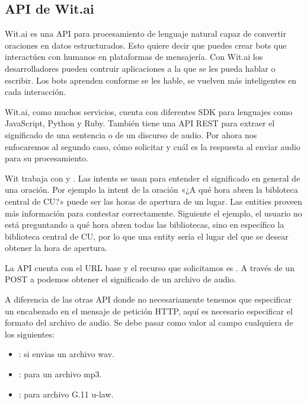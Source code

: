 \subsection{API de Wit.ai}
\label{\detokenize{chapter_one/apis_rest:api-de-wit-ai}}
Wit.ai es una API para procesamiento de lenguaje natural capaz de convertir
oraciones en datos estructurados. Esto quiere decir que puedes crear bots
que interactúen con humanos en plataformas de mensajería. Con Wit.ai los
desarrolladores pueden contruir aplicaciones a la que se les pueda hablar o
escribir. Los bots aprenden conforme se les hable, se vuelven más inteligentes
en cada interacción.

Wit.ai, como muchos servicios, cuenta con diferentes SDK para lenguajes como
JavaScript, Python y Ruby. También tiene una API REST para extraer el significado
de una sentencia o de un discurso de audio. Por ahora nos enfocaremos
al segundo caso, cómo solicitar y cuál es la respuesta al enviar audio
para su procesamiento.

Wit trabaja con  y . Las intents se usan para entender
el significado en general de una oración. Por ejemplo la intent
de la oración «¿A qué hora abren la bibloteca central de CU?»
puede ser las horas de apertura de un lugar. Las entities
proveen más información para contestar correctamente. Siguiente el ejemplo,
el usuario no está preguntando a qué hora abren todas las bibliotecas,
sino en específico la biblioteca central de CU, por lo que
una entity sería el lugar del que se desear obtener la hora de apertura.

La API cuenta con el URL base  y el recurso que
solicitamos es . A través de un POST a 
podemos obtener el significado de un archivo de audio.

A diferencia de las otras API donde no necesariamente tenemos que especificar
un encabezado en el mensaje de petición HTTP, aquí es necesario especificar
el formato del archivo de audio. Se debe pasar como valor al campo
 cualquiera de los siguientes:
\begin{itemize}
\item {} 
: si envias un archivo wav.

\item {} 
: para un archivo mp3.

\item {} 
: para archivo G.11 u-law.

\end{itemize}

